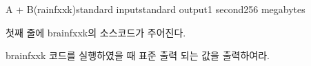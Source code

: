 \begin{problem}{A + B(rainfxxk)}{standard input}{standard output}{1 second}{256 megabytes}
\begin{enumerate}
\end{enumerate}


\InputFile
첫째 줄에 brainfxxk의 소스코드가 주어진다.

\OutputFile
brainfxxk 코드를 실행하였을 때 표준 출력 되는 값을 출력하여라.

\Examples

\begin{example}
%
%
\end{example}

\end{problem}

